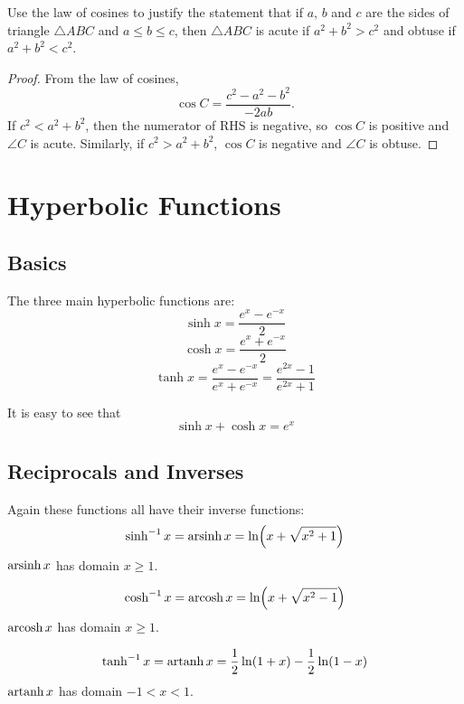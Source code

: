 \begin{exercise}
Use the law of cosines to justify the statement that if $a$, $b$ and $c$ are the sides of triangle $\triangle ABC$ and $a\le b\le c$, then $\triangle ABC$ is acute if $a^2+b^2>c^2$ and obtuse if $a^2+b^2<c^2$.
\end{exercise}
\begin{proof}
From the law of cosines,
\[ \cos C=\frac{c^2-a^2-b^2}{-2ab}. \]
If $c^2<a^2+b^2$, then the numerator of RHS is negative, so $\cos C$ is positive and $\angle C$ is acute. Similarly, if $c^2>a^2+b^2$, $\cos C$ is negative and $\angle C$ is obtuse.
\end{proof}
\pagebreak

\section{Hyperbolic Functions}
\subsection{Basics}
The three main hyperbolic functions are:
\begin{equation}
\sinh x = \frac{e^x-e^{-x}}{2}
\end{equation}
\begin{equation}
\cosh x = \frac{e^x+e^{-x}}{2}
\end{equation}
\begin{equation}
\tanh x = \frac{e^x-e^{-x}}{e^x+e^{-x}} = \frac{e^{2x}-1}{e^{2x}+1}
\end{equation}

It is easy to see that
\[ \sinh x + \cosh x = e^x \]

\subsection{Reciprocals and Inverses}
Again these functions all have their inverse functions:
\begin{equation}
\sinh^{-1} x = \operatorname{arsinh} x = \ln(x+\sqrt{x^2+1})
\end{equation}
$\operatorname{arsinh} x$ has domain $x \ge 1$.

\begin{equation}
\cosh^{-1} x = \operatorname{arcosh} x = \ln(x+\sqrt{x^2-1})
\end{equation}
$\operatorname{arcosh} x$ has domain $x \ge 1$.

\begin{equation}
\tanh^{-1} x = \operatorname{artanh} x = \frac{1}{2}\ln(1+x)-\frac{1}{2}\ln(1-x)
\end{equation}
$\operatorname{artanh} x$ has domain $-1<x<1$.

